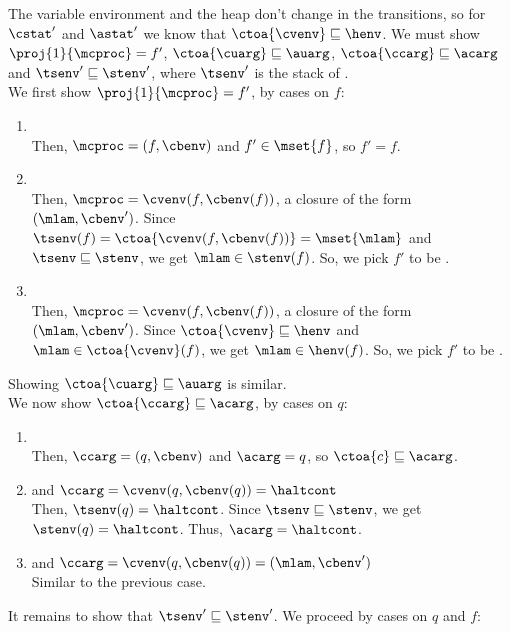 \documentclass{LMCS}
\theoremstyle{definition} \newtheorem{property}[thm]{Property}
\begin{document}
\begin{enumerate}[$\bullet$]
    The variable environment and the heap don't change in the transitions, so 
    for $\cstat'$ and $\astat'$ we know that $\ctoa{\cvenv} \sqsubseteq \henv$.
    We must show $\proj{1}{\mcproc} = f'$, $\ctoa{\cuarg} \sqsubseteq \auarg$,
    $\ctoa{\ccarg} \sqsubseteq \acarg$ and $\tsenv' \sqsubseteq \stenv'$,
    where $\tsenv'$ is the stack of . \\
    We first show $\proj{1}{\mcproc} = f'$, by cases on $f$:
    \begin{enumerate}[$\bullet$]
    \item 
       \\
      Then, $\mcproc = (f, \cbenv)$ and $f' \in \mset{f}$, so $f' = f$.
    \item
       \\
      Then, $\mcproc = \cvenv(f, \cbenv(f))$, a closure of the form 
      $(\mlam, \cbenv')$.
      Since $\tsenv(f) = \ctoa{\cvenv(f, \cbenv(f))}= \mset{\mlam}$ and
      $\tsenv \sqsubseteq \stenv$, we get $\mlam \in \stenv(f)$.
      So, we pick $f'$ to be \mlam.
    \item
       \\
      Then, $\mcproc = \cvenv(f, \cbenv(f))$, a closure of the form 
      $(\mlam, \cbenv')$.
      Since $\ctoa{\cvenv} \sqsubseteq \henv$ and $\mlam \in \ctoa{\cvenv}(f)$,
      we get $\mlam \in \henv(f)$.
      So, we pick $f'$ to be \mlam.
    \end{enumerate}
    Showing $\ctoa{\cuarg} \sqsubseteq \auarg$ is similar. \\
    We now show $\ctoa{\ccarg} \sqsubseteq \acarg$, by cases on $q$:
    \begin{enumerate}[$\bullet$]
    \item 
       \\
      Then, $\ccarg=(q,\cbenv)$ and $\acarg=q$, so $\ctoa{c}\sqsubseteq\acarg$.
    \item 
       and $\ccarg = \cvenv(q, \cbenv(q)) = \haltcont$ \\
      Then, $\tsenv(q) = \haltcont$.
      Since $\tsenv \sqsubseteq \stenv$, we get $\stenv(q) = \haltcont$.
      Thus, $\acarg = \haltcont$.
    \item
       and $\ccarg = \cvenv(q, \cbenv(q)) = (\mlam, \cbenv')$ \\
      Similar to the previous case.
    \end{enumerate}
    It remains to show that $\tsenv' \sqsubseteq \stenv'$.
    We proceed by cases on $q$ and $f$: 

\end{enumerate}
\end{document}
